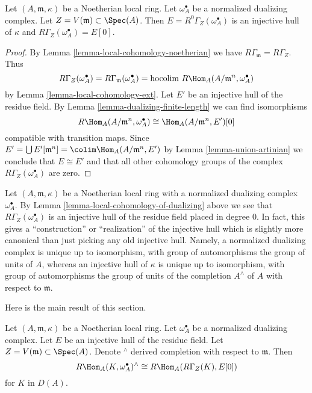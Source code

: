 \begin{lemma}
\label{lemma-local-cohomology-of-dualizing}
Let $(A, \mathfrak m, \kappa)$ be a Noetherian local ring.
Let $\omega_A^\bullet$ be a normalized dualizing complex.
Let $Z = V(\mathfrak m) \subset \Spec(A)$.
Then $E = R^0\Gamma_Z(\omega_A^\bullet)$ is an injective hull of
$\kappa$ and $R\Gamma_Z(\omega_A^\bullet) = E[0]$.
\end{lemma}

\begin{proof}
By Lemma \ref{lemma-local-cohomology-noetherian} we have
$R\Gamma_{\mathfrak m} = R\Gamma_Z$. Thus
$$
R\Gamma_Z(\omega_A^\bullet) =
R\Gamma_{\mathfrak m}(\omega_A^\bullet) =
\text{hocolim}\ R\Hom_A(A/\mathfrak m^n, \omega_A^\bullet)
$$
by Lemma \ref{lemma-local-cohomology-ext}. Let $E'$ be an injective
hull of the residue field.
By Lemma \ref{lemma-dualizing-finite-length}
we can find isomorphisms
$$
R\Hom_A(A/\mathfrak m^n, \omega_A^\bullet) \cong \Hom_A(A/\mathfrak m^n, E')[0]
$$
compatible with transition maps. Since
$E' = \bigcup E'[\mathfrak m^n] = \colim \Hom_A(A/\mathfrak m^n, E')$
by Lemma \ref{lemma-union-artinian}
we conclude that $E \cong E'$ and that all other cohomology
groups of the complex $R\Gamma_Z(\omega_A^\bullet)$ are zero.
\end{proof}

\begin{remark}
\label{remark-specific-injective-hull}
Let $(A, \mathfrak m, \kappa)$ be a Noetherian local ring
with a normalized dualizing complex $\omega_A^\bullet$.
By Lemma \ref{lemma-local-cohomology-of-dualizing}
above we see that $R\Gamma_Z(\omega_A^\bullet)$
is an injective hull of the residue field placed in degree $0$.
In fact, this gives a ``construction'' or ``realization''
of the injective hull which is slightly more canonical than
just picking any old injective hull. Namely, a normalized
dualizing complex is unique up to isomorphism, with group
of automorphisms the group of units of $A$, whereas an
injective hull of $\kappa$ is unique up to isomorphism, with
group of automorphisms the group of units of the completion
$A^\wedge$ of $A$ with respect to $\mathfrak m$.
\end{remark}

\noindent
Here is the main result of this section.

\begin{theorem}
\label{theorem-local-duality}
Let $(A, \mathfrak m, \kappa)$ be a Noetherian local ring.
Let $\omega_A^\bullet$ be a normalized dualizing complex.
Let $E$ be an injective hull of the residue field.
Let $Z = V(\mathfrak m) \subset \Spec(A)$.
Denote ${}^\wedge$ derived completion with respect to $\mathfrak m$.
Then
$$
R\Hom_A(K, \omega_A^\bullet)^\wedge \cong R\Hom_A(R\Gamma_Z(K), E[0])
$$
for $K$ in $D(A)$.
\end{theorem}

